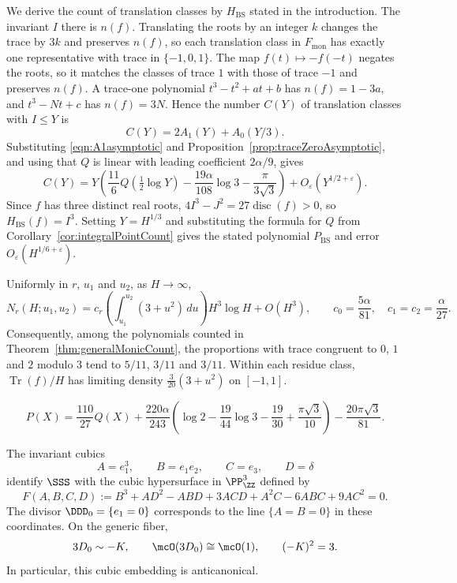 \begin{rem}\label{rem:translationClasses} We derive the count of translation classes by $H_{\mathrm{BS}}$ stated in the introduction. The invariant $I$ there is $n(f)$. Translating the roots by an integer $k$ changes the trace by $3k$ and preserves $n(f)$, so each translation class in $F_{\mathrm{mon}}$ has exactly one representative with trace in $\{-1,0,1\}$. The map $f(t)\mapsto-f(-t)$ negates the roots, so it matches the classes of trace $1$ with those of trace $-1$ and preserves $n(f)$. A trace-one polynomial $t^3-t^2+at+b$ has $n(f)=1-3a$, and $t^3-Nt+c$ has $n(f)=3N$. Hence the number $C(Y)$ of translation classes with $I\leq Y$ is \[ C(Y)=2A_1(Y)+A_0(Y/3). \] Substituting \eqref{eqn:A1asymptotic} and Proposition~\ref{prop:traceZeroAsymptotic}, and using that $Q$ is linear with leading coefficient $2\alpha/9$, gives \[ C(Y)=Y\left(\frac{11}{6}Q\left(\tfrac12\log Y\right) -\frac{19\alpha}{108}\log3-\frac{\pi}{3\sqrt3}\right) +O_\varepsilon(Y^{1/2+\varepsilon}). \] Since $f$ has three distinct real roots, $4I^3-J^2=27\operatorname{disc}(f)>0$, so $H_{\mathrm{BS}}(f)=I^3$. Setting $Y=H^{1/3}$ and substituting the formula for $Q$ from Corollary~\ref{cor:integralPointCount} gives the stated polynomial $P_{\mathrm{BS}}$ and error $O_\varepsilon(H^{1/6+\varepsilon})$. \end{rem}

\begin{theorem}\label{thm:traceDistribution} Uniformly in $r$, $u_1$ and $u_2$, as $H\to\infty$, \[ N_r(H;u_1,u_2) =c_r\left(\int_{u_1}^{u_2}(3+u^2)\,du\right)H^3\log H+O(H^3), \qquad c_0=\frac{5\alpha}{81},\quad c_1=c_2=\frac{\alpha}{27}. \] Consequently, among the polynomials counted in Theorem~\ref{thm:generalMonicCount}, the proportions with trace congruent to $0$, $1$ and $2$ modulo $3$ tend to $5/11$, $3/11$ and $3/11$. Within each residue class, $\operatorname{Tr}(f)/H$ has limiting density $\frac{3}{20}(3+u^2)$ on $[-1,1]$. \end{theorem}

\begin{equation}\label{eqn:monicConstantsFromTraceCounts} P(X) =\frac{110}{27}Q(X) +\frac{220\alpha}{243}\left(\log2-\frac{19}{44}\log3 -\frac{19}{30}+\frac{\pi\sqrt3}{10}\right) -\frac{20\pi\sqrt3}{81}. \end{equation}

\begin{proposition}\label{prop:surfaceIntegralCubic} The invariant cubics \[ A=e_1^3,\qquad B=e_1e_2,\qquad C=e_3,\qquad D=\delta \] identify $\SSS$ with the cubic hypersurface in $\PP^3_\ZZ$ defined by \begin{equation}\label{eqn:surfaceIntegralCubic} F(A,B,C,D):=B^3+AD^2-ABD+3ACD+A^2C-6ABC+9AC^2=0. \end{equation} The divisor $\DDD_0=\{e_1=0\}$ corresponds to the line $\{A=B=0\}$ in these coordinates. On the generic fiber, \begin{equation}\label{eqn:surfaceAnticanonical} 3D_0\sim-K,\qquad \mcO(3D_0)\cong\mcO(1),\qquad (-K)^2=3. \end{equation} In particular, this cubic embedding is anticanonical. \end{proposition}

